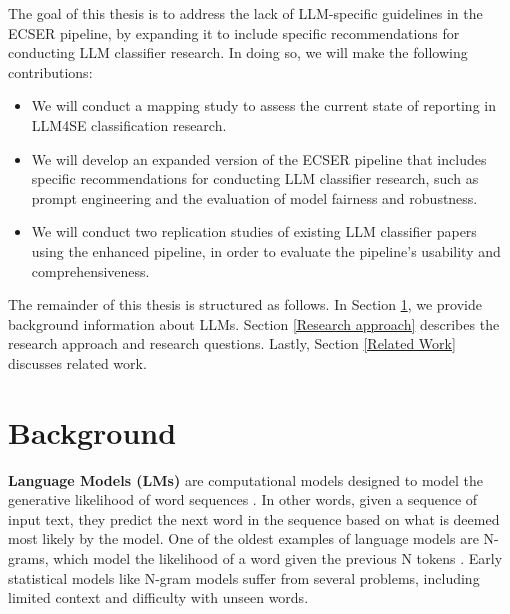 \documentclass[a4paper]{article}
\begin{document}
The goal of this thesis is to address the lack of LLM-specific guidelines in the ECSER pipeline, by expanding it to include specific recommendations for conducting LLM classifier research. In doing so, we will make the following contributions:
\begin{itemize}
    \item We will conduct a mapping study to assess the current state of reporting in LLM4SE classification research.
    \item We will develop an expanded version of the ECSER pipeline that includes specific recommendations for conducting LLM classifier research, such as prompt engineering and the evaluation of model fairness and robustness.
    \item We will conduct two replication studies of existing LLM classifier papers using the enhanced pipeline, in order to evaluate the pipeline's usability and comprehensiveness.
\end{itemize}

The remainder of this thesis is structured as follows. In Section \ref{Background}, we provide background information about LLMs. Section \ref{Research approach} describes the research approach and research questions. Lastly, Section \ref{Related Work} discusses related work.

\section{Background}\label{Background}
\textbf{Language Models (LMs)} are computational models designed to model the generative likelihood of word sequences \cite{zhao2025}. In other words, given a sequence of input text, they predict the next word in the sequence based on what is deemed most likely by the model. One of the oldest examples of language models are N-grams, which model the likelihood of a word given the previous N tokens \cite{shannon1948}. Early statistical models like N-gram models suffer from several problems, including limited context and difficulty with unseen words.
\end{document}
